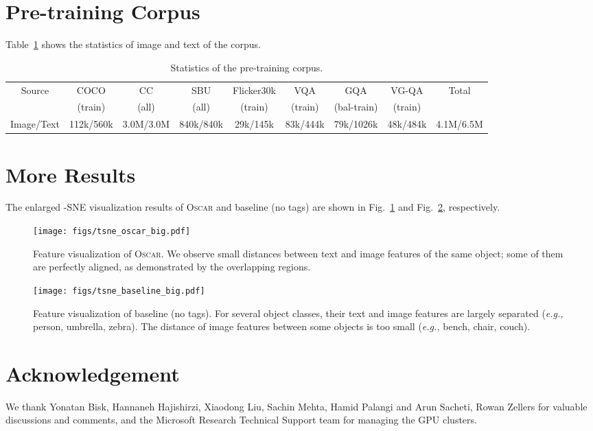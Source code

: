 \documentclass[runningheads]{llncs}
\newcommand{\eg}[0]{\emph{e.g., }}
\newcommand{\short}{\textsc{Oscar}}
\begin{document}
\section{Pre-training Corpus}
Table~\ref{tab:pretrain_corpus} shows the statistics of image and text of the corpus.
\begin{table}[h]
\begin{center}
\vspace{-5mm}
\caption{Statistics of the pre-training corpus.}
\scriptsize
\label{tab:pretrain_corpus}
\begin{tabular}{c|c|c|c|c|c|c|c|c}
\toprule
\multirow{2}{*}{Source} & COCO & CC & SBU & Flicker30k & VQA & GQA & VG-QA & Total \\
 & (train) & (all) & (all) & (train) & (train) & (bal-train) & (train) &  \\ 
\midrule
Image/Text & 112k/560k & 3.0M/3.0M & 840k/840k & 29k/145k & 83k/444k & 79k/1026k & 48k/484k & 4.1M/6.5M  \\
\bottomrule
\end{tabular}
\end{center}
\vspace{-5mm}
\end{table}


\vspace{-3mm}
\section{More Results}
The enlarged -SNE visualization results of \short{} and baseline (no tags) are shown in Fig.~\ref{fig:tsne_oscar_big} and Fig.~\ref{fig:tsne_baseline_big}, respectively.

\begin{figure}[t!]
\centering
{\texttt{[image: figs/tsne\_oscar\_big.pdf]}}
 \vspace{-0mm}
\caption{Feature visualization of \short{}. We observe small distances between text and image features of the same object; some of them are perfectly aligned, as demonstrated by the overlapping regions.}
\label{fig:tsne_oscar_big}
 \vspace{-0mm}
 \end{figure}
\begin{figure}[t!]
\centering
{\texttt{[image: figs/tsne\_baseline\_big.pdf]}}
 \vspace{-0mm}
\caption{Feature visualization of baseline (no tags). For several object classes, their text and image features are largely separated (\eg person, umbrella, zebra). The distance of image features between some objects is too small (\eg bench, chair, couch).}
\label{fig:tsne_baseline_big}
 \vspace{-0mm}
 \end{figure}
 
 
\section*{Acknowledgement}
We thank Yonatan Bisk, Hannaneh Hajishirzi, Xiaodong Liu, Sachin Mehta, Hamid Palangi and Arun Sacheti, Rowan Zellers for valuable discussions and comments, and the Microsoft Research Technical Support team for managing the GPU clusters. 
\end{document}
